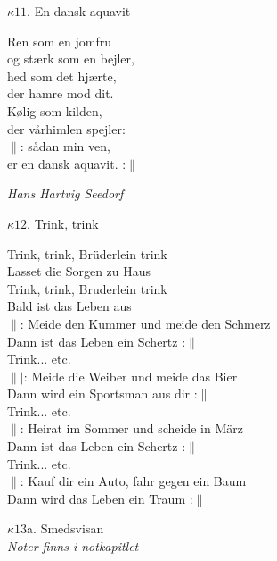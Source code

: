 \documentclass[a6paper,10pt]{article}
\begin{document}
\setlength{\oddsidemargin}{-0.37in}
\noindent
\begin{center}
\Large $\kappa11$. En dansk aquavit \\ 
\end{center}
Ren som en jomfru\\
og stærk som en bejler,\\
hed som det hjærte,\\
der hamre mod dit.
\vspace{5pt}\\
Kølig som kilden,\\
der vårhimlen spejler:\\
$\|$: sådan min ven,\\
er en dansk aquavit. :$\|$ 
\begin{flushright}
\textit{Hans Hartvig Seedorf}
\end{flushright}
\begin{center}
\Large $\kappa12$. Trink, trink \\ 
\end{center}
Trink, trink, Brüderlein trink\\
Lasset die Sorgen zu Haus\\
Trink, trink, Bruderlein trink\\
Bald ist das Leben aus
\vspace{5pt}\\
$\|$: Meide den Kummer und meide den Schmerz\\
Dann ist das Leben ein Schertz :$\|$
\vspace{5pt}\\
Trink... etc.
\vspace{5pt}\\
$\||$: Meide die Weiber und meide das Bier\\
Dann wird ein Sportsman aus dir :$\|$
\vspace{5pt}\\
Trink... etc.
\vspace{5pt}\\
$\|$: Heirat im Sommer und scheide in März\\
Dann ist das Leben ein Schertz :$\|$
\vspace{5pt}\\
Trink... etc.
\vspace{5pt}\\
$\|$: Kauf dir ein Auto, fahr gegen ein Baum\\
Dann wird das Leben ein Traum :$\|$
\setlength{\oddsidemargin}{-0.47in}
\noindent
\begin{center}
\Large $\kappa13$a. Smedsvisan \\
\small\textit{Noter finns i notkapitlet}
\end{center}
\end{document}
